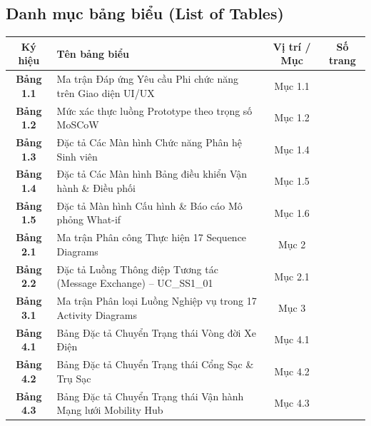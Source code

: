 \documentclass[12pt,a4paper]{article}
\begin{document}
\vspace{0.4cm}
\subsection*{Danh mục bảng biểu (List of Tables)}
\begin{center}
\renewcommand{\arraystretch}{1.2}
\small
\begin{tabularx}{\textwidth}{|c|X|c|c|}
    \hline
    \textbf{Ký hiệu} & \textbf{Tên bảng biểu} & \textbf{Vị trí / Mục} & \textbf{Số trang} \\
    \hline
    \textbf{Bảng 1.1} & Ma trận Đáp ứng Yêu cầu Phi chức năng trên Giao diện UI/UX & Mục 1.1 & \pageref{tab:ui-nfr-matrix} \\
    \hline
    \textbf{Bảng 1.2} & Mức xác thực luồng Prototype theo trọng số MoSCoW & Mục 1.2 & \pageref{tab:moscow-scope} \\
    \hline
    \textbf{Bảng 1.3} & Đặc tả Các Màn hình Chức năng Phân hệ Sinh viên & Mục 1.4 & \pageref{tab:ui-student-screens} \\
    \hline
    \textbf{Bảng 1.4} & Đặc tả Các Màn hình Bảng điều khiển Vận hành \& Điều phối & Mục 1.5 & \pageref{tab:ui-operator-screens} \\
    \hline
    \textbf{Bảng 1.5} & Đặc tả Màn hình Cấu hình \& Báo cáo Mô phỏng What-if & Mục 1.6 & \pageref{tab:ui-whatif-screens} \\
    \hline
    \textbf{Bảng 2.1} & Ma trận Phân công Thực hiện 17 Sequence Diagrams & Mục 2 & \pageref{tab:seq-assignment} \\
    \hline
    \textbf{Bảng 2.2} & Đặc tả Luồng Thông điệp Tương tác (Message Exchange) -- UC\_SS1\_01 & Mục 2.1 & \pageref{tab:msg-ss1-01} \\
    \hline
    \textbf{Bảng 3.1} & Ma trận Phân loại Luồng Nghiệp vụ trong 17 Activity Diagrams & Mục 3 & \pageref{tab:act-matrix} \\
    \hline
    \textbf{Bảng 4.1} & Bảng Đặc tả Chuyển Trạng thái Vòng đời Xe Điện & Mục 4.1 & \pageref{tab:state-ev-spec} \\
    \hline
    \textbf{Bảng 4.2} & Bảng Đặc tả Chuyển Trạng thái Cổng Sạc \& Trụ Sạc & Mục 4.2 & \pageref{tab:state-charger-spec} \\
    \hline
    \textbf{Bảng 4.3} & Bảng Đặc tả Chuyển Trạng thái Vận hành Mạng lưới Mobility Hub & Mục 4.3 & \pageref{tab:state-hub-spec} \\
    \hline
\end{tabularx}
\end{center}
\vspace*{\fill}
\newpage
\end{document}
